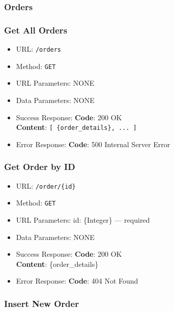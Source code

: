 \subsubsection*{Orders}

\subsubsection*{Get All Orders}

\begin{itemize}
    \item URL: \texttt{/orders}
    \item Method: \texttt{GET}
    \item URL Parameters: NONE
    \item Data Parameters: NONE

    \item Success Response: \newline
    \textbf{Code}: 200 OK \\
    \textbf{Content}: \texttt{[ \{order\_details\}, ... ]}

    \item Error Response: \newline
    \textbf{Code}: 500 Internal Server Error
\end{itemize}

\subsubsection*{Get Order by ID}

\begin{itemize}
    \item URL: \texttt{/order/\{id\}}
    \item Method: \texttt{GET}
    \item URL Parameters: id: \{Integer\} — required
    \item Data Parameters: NONE

    \item Success Response: \newline
    \textbf{Code}: 200 OK \\
    \textbf{Content}: \{order\_details\}

    \item Error Response: \newline
    \textbf{Code}: 404 Not Found
\end{itemize}

\subsubsection*{Insert New Order}

